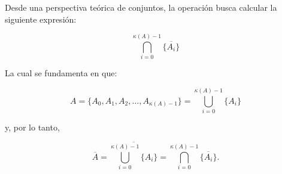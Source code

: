 Desde una perspectiva teórica de conjuntos, la operación busca calcular la siguiente expresión:

\[
\bigcap_{i=0}^{ \kappa(A)-1} \overline{\{A_i\}}
\]

La cual se fundamenta en que:

\[
A = \{A_0, A_1, A_2, \ldots, A_{\kappa(A)-1}\} 
    = \bigcup_{i=0}^{\kappa(A)-1} \{A_i\}
\]

y, por lo tanto,

\[
\overline{A} 
    = \overline{\bigcup_{i=0}^{\kappa(A)-1} \{A_i\}}
    = \bigcap_{i=0}^{\kappa(A)-1} \overline{\{A_i\}}.
\]

